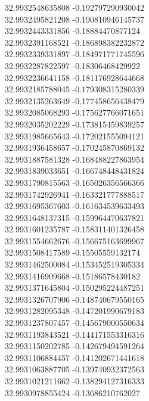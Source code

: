 {32.9932548635808	-0.192797290930042\\
32.9932495821208	-0.190810946145737\\
32.9932443331856	-0.18884470877124\\
32.9932391168521	-0.186898382232872\\
32.9932339331897	-0.184971771745596\\
32.9932287822597	-0.18306468429922\\
32.9932236641158	-0.181176928644668\\
32.9932185788045	-0.179308315280339\\
32.9932135263649	-0.177458656438479\\
32.9932085068293	-0.175627766071651\\
32.9932035202229	-0.173815459839257\\
32.9931985665643	-0.172021555094121\\
32.9931936458657	-0.170245870869132\\
32.9931887581328	-0.168488227863954\\
32.9931839033651	-0.166748448431824\\
32.9931790815563	-0.165026356566366\\
32.9931742926941	-0.163321777888517\\
32.9931695367603	-0.161634539633493\\
32.9931648137315	-0.159964470637821\\
32.9931601235787	-0.158311401326458\\
32.9931554662676	-0.156675163699967\\
32.9931508417589	-0.15505559132174\\
32.9931462500084	-0.153452519305334\\
32.9931416909668	-0.15186578430182\\
32.9931371645804	-0.150295224487251\\
32.9931326707906	-0.148740679550165\\
32.9931282095348	-0.147201990679183\\
32.9931237807457	-0.145679000550634\\
32.9931193843521	-0.144171553316316\\
32.9931150202785	-0.142679494591264\\
32.9931106884457	-0.141202671441618\\
32.9931063887705	-0.139740932372563\\
32.9931021211662	-0.138294127316333\\
32.9930978855424	-0.13686210762027\\
}
